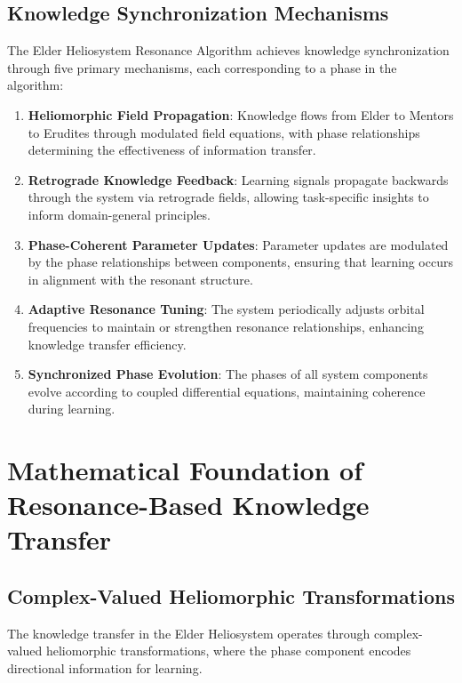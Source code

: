 \subsection{Knowledge Synchronization Mechanisms}

The Elder Heliosystem Resonance Algorithm achieves knowledge synchronization through five primary mechanisms, each corresponding to a phase in the algorithm:

\begin{enumerate}
    \item \textbf{Heliomorphic Field Propagation}: Knowledge flows from Elder to Mentors to Erudites through modulated field equations, with phase relationships determining the effectiveness of information transfer.
    
    \item \textbf{Retrograde Knowledge Feedback}: Learning signals propagate backwards through the system via retrograde fields, allowing task-specific insights to inform domain-general principles.
    
    \item \textbf{Phase-Coherent Parameter Updates}: Parameter updates are modulated by the phase relationships between components, ensuring that learning occurs in alignment with the resonant structure.
    
    \item \textbf{Adaptive Resonance Tuning}: The system periodically adjusts orbital frequencies to maintain or strengthen resonance relationships, enhancing knowledge transfer efficiency.
    
    \item \textbf{Synchronized Phase Evolution}: The phases of all system components evolve according to coupled differential equations, maintaining coherence during learning.
\end{enumerate}

\section{Mathematical Foundation of Resonance-Based Knowledge Transfer}

\subsection{Complex-Valued Heliomorphic Transformations}

The knowledge transfer in the Elder Heliosystem operates through complex-valued heliomorphic transformations, where the phase component encodes directional information for learning.


